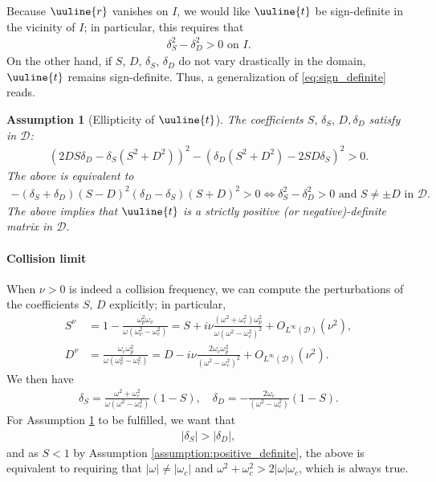 \documentclass[report]{elsarticle}
\newtheorem{assumption}[theorem]{Assumption}
\numberwithin{theorem}{section}
\begin{document}
Because $\uuline{r}$ vanishes on $I$, we would like $\uuline{t}$ be sign-definite in the vicinity of $I$; in particular, this requires that 
\begin{align}
	\label{eq:sign_definite}
	\delta_S^2-\delta_D^2>0 \text{ on }I.
\end{align}
On the other hand, if $S$, $D$, $\delta_S$, $\delta_D$ do not vary drastically in the domain, $\uuline{t}$ remains sign-definite. Thus, a generalization of \eqref{eq:sign_definite} reads. 
\begin{assumption}[Ellipticity of $\uuline{t}$]
	\label{assump:coefficients_positivity}
The coefficients $S, \, \delta_S, \, D, \delta_D$ satisfy in $\mathcal{D}$: 
	\begin{align*}
\left(2DS\delta_D-\delta_S(S^2+D^2)\right)^2-(\delta_D(S^2+D^2)-2SD\delta_S)^2>0.
	\end{align*}
The above is equivalent to
\begin{align*}
	-(\delta_S+\delta_D)(S-D)^2(\delta_D-\delta_S)(S+D)^2>0 \iff \delta_S^2-\delta_D^2>0 \text{ and }S\neq \pm D\text{ in }\mathcal{D}. 
\end{align*}
The above implies that $\uuline{t}$ is a strictly positive (or negative)-definite matrix in $\mathcal{D}$. 
\end{assumption}
\paragraph{Collision limit}
When $\nu>0$ is indeed a collision frequency, we can compute the perturbations of the coefficients $S, \, D$ explicitly; in particular, 
	\begin{align*}
S^{\nu}&=1-\frac{\omega_p^2\omega_{\nu}}{\omega(\omega_{\nu}^2-\omega_c^2)}=S+i\nu\frac{(\omega^2+\omega_c^2)\omega_p^2}{\omega(\omega^2-\omega_c^2)^2}+O_{L^{\infty}(\mathcal{D})}(\nu^2),\\
D^{\nu}&=\frac{\omega_c\omega_p^2}{\omega(\omega_{\nu}^2-\omega_c^2)}=D-i\nu\frac{2\omega_c\omega_p^2}{(\omega^2-\omega_c^2)^2}+O_{L^{\infty}(\mathcal{D})}(\nu^2).
	\end{align*}
We then have 
\begin{align}
	\label{eq:deltas}
	\delta_S=\frac{\omega^2+\omega_c^2}{\omega(\omega^2-\omega_c^2)}\left(1-S\right), \quad \delta_D=-\frac{2\omega_c}{(\omega^2-\omega_c^2)}\left(1-S\right). 
\end{align}
For Assumption \ref{assump:coefficients_positivity} to be fulfilled, we want that 
\begin{align*}
	|\delta_S|>|\delta_D|,
\end{align*}
and as $S<1$ by Assumption \ref{assumption:positive_definite}, the above is equivalent to requiring that $|\omega|\neq |\omega_c|$ and $\omega^2+\omega_c^2>2|\omega|\omega_c$, which is always true. 
\end{document}
